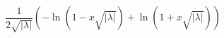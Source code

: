\begin{displaymath}
 \frac{1}{2\sqrt{|\lambda|}}
 \left(
-\ln (1 - x\sqrt{|\lambda|}) + \ln (1 + x\sqrt{|\lambda|})
 \right)
\end{displaymath}